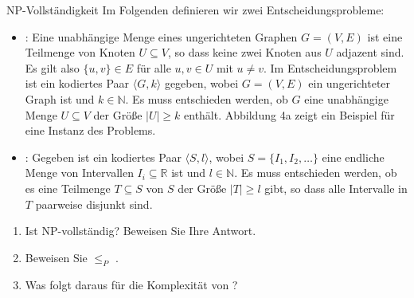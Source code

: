 \documentclass{article}
\begin{document}
\begin{exercise}{NP-Vollständigkeit}
  Im Folgenden definieren wir zwei Entscheidungsprobleme:
  \begin{itemize}
    \item {}: Eine unabhängige Menge eines ungerichteten Graphen $G = (V,E)$ ist eine Teilmenge von Knoten $U \subseteq V$, so dass keine zwei Knoten aus $U$ adjazent sind. Es gilt also $\{u,v\} \in E$ für alle $u,v \in U$ mit $u \neq v$. Im Entscheidungsproblem  ist ein kodiertes Paar $\langle G, k \rangle$ gegeben, wobei $G = (V,E)$ ein ungerichteter Graph ist und $k \in \mathbb{N}$. Es muss entschieden werden, ob $G$ eine unabhängige Menge $U \subseteq V$ der Größe $|U| \geq k$ enthält. Abbildung 4a zeigt ein Beispiel für eine Instanz des Problems.
    \item {}: Gegeben ist ein kodiertes Paar $\langle S, l \rangle$, wobei $S = \{I_1, I_2, \dots\}$ eine endliche Menge von Intervallen $I_i \subseteq \mathbb{R}$ ist und $l \in \mathbb{N}$. Es muss entschieden werden, ob es eine Teilmenge $T \subseteq S$ von $S$ der Größe $|T| \geq l$ gibt, so dass alle Intervalle in $T$ paarweise disjunkt sind.
  \end{itemize}
  \begin{enumerate}
    \item Ist  NP-vollständig? Beweisen Sie Ihre Antwort.
    \item Beweisen Sie  $\leq_P$ .
    \item Was folgt daraus für die Komplexität von ?
  \end{enumerate}

  \begin{solution}

  \end{solution}
\end{exercise}
\end{document}
